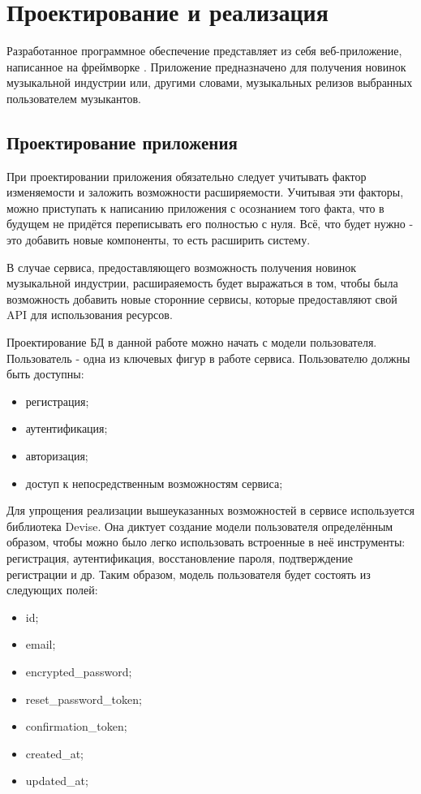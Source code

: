 \section{Проектирование и реализация} %
\label{sec:arch_and_realization}


Разработанное программное обеспечение представляет из себя веб-приложение, написанное на фреймворке \ror.
Приложение предназначено для получения новинок музыкальной индустрии или, другими словами, музыкальных релизов выбранных пользователем музыкантов.

\subsection{Проектирование приложения}
\label{sub:arch_and_mod:design}
При проектировании приложения обязательно следует учитывать фактор изменяемости и заложить возможности расширяемости. Учитывая эти факторы, можно приступать к написанию приложения с осознанием того факта, что в будущем не придётся переписывать его полностью с нуля. Всё, что будет нужно - это добавить новые компоненты, то есть расширить систему.

В случае сервиса, предоставляющего возможность получения новинок музыкальной индустрии, расшираяемость будет выражаться в том, чтобы была возможность добавить новые сторонние сервисы, которые предоставляют свой API для использования ресурсов.

Проектирование БД в данной работе можно начать с модели пользователя. Пользователь - одна из ключевых фигур в работе сервиса. Пользователю должны быть доступны:

\begin{itemize}
  \item регистрация;
  \item аутентификация;
  \item авторизация;
  \item доступ к непосредственным возможностям сервиса;
\end{itemize}

Для упрощения реализации вышеуказанных возможностей в сервисе используется библиотека Devise. Она диктует создание модели пользователя определённым образом, чтобы можно было легко использовать встроенные в неё инструменты: регистрация, аутентификация, восстановление пароля, подтверждение регистрации и др. Таким образом, модель пользователя будет состоять из следующих полей:

\begin{itemize}
  \item id;
  \item email;
  \item encrypted\_password;
  \item reset\_password\_token;
  \item confirmation\_token;
  \item created\_at;
  \item updated\_at;
\end{itemize}

